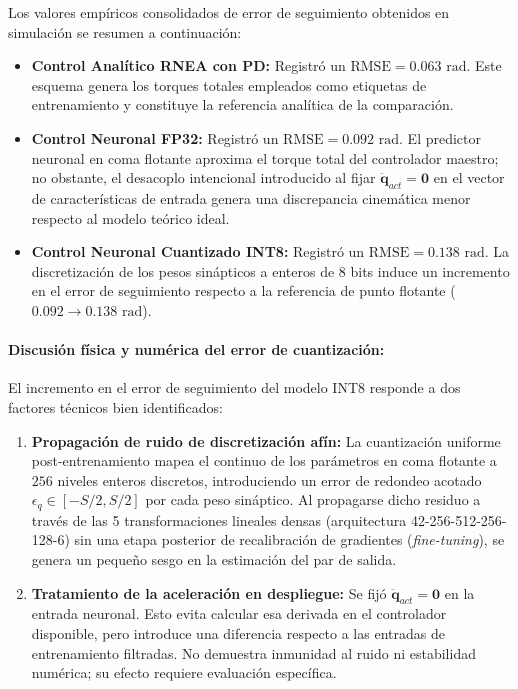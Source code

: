 \documentclass[12pt]{article}
\begin{document}
Los valores empíricos consolidados de error de seguimiento obtenidos en simulación se resumen a continuación:
\begin{itemize}
    \item \textbf{Control Analítico RNEA con PD:} Registró un $\text{RMSE} = 0.063\text{ rad}$. Este esquema genera los torques totales empleados como etiquetas de entrenamiento y constituye la referencia analítica de la comparación.
    \item \textbf{Control Neuronal FP32:} Registró un $\text{RMSE} = 0.092\text{ rad}$. El predictor neuronal en coma flotante aproxima el torque total del controlador maestro; no obstante, el desacoplo intencional introducido al fijar $\ddot{\bm{q}}_{act} = \bm{0}$ en el vector de características de entrada genera una discrepancia cinemática menor respecto al modelo teórico ideal.
    \item \textbf{Control Neuronal Cuantizado INT8:} Registró un $\text{RMSE} = 0.138\text{ rad}$. La discretización de los pesos sinápticos a enteros de 8 bits induce un incremento en el error de seguimiento respecto a la referencia de punto flotante ($0.092 \to 0.138\text{ rad}$).
\end{itemize}

\paragraph*{Discusión física y numérica del error de cuantización:}
El incremento en el error de seguimiento del modelo INT8 responde a dos factores técnicos bien identificados:
\begin{enumerate}
    \item \textbf{Propagación de ruido de discretización afín:} La cuantización uniforme post-entrenamiento mapea el continuo de los parámetros en coma flotante a $256$ niveles enteros discretos, introduciendo un error de redondeo acotado $\epsilon_q \in [-S/2, S/2]$ por cada peso sináptico. Al propagarse dicho residuo a través de las 5 transformaciones lineales densas (arquitectura 42-256-512-256-128-6) sin una etapa posterior de recalibración de gradientes (\textit{fine-tuning}), se genera un pequeño sesgo en la estimación del par de salida.
    \item \textbf{Tratamiento de la aceleración en despliegue:} Se fijó $\ddot{\bm{q}}_{act}=\bm{0}$ en la entrada neuronal. Esto evita calcular esa derivada en el controlador disponible, pero introduce una diferencia respecto a las entradas de entrenamiento filtradas. No demuestra inmunidad al ruido ni estabilidad numérica; su efecto requiere evaluación específica.
\end{enumerate}
\end{document}
